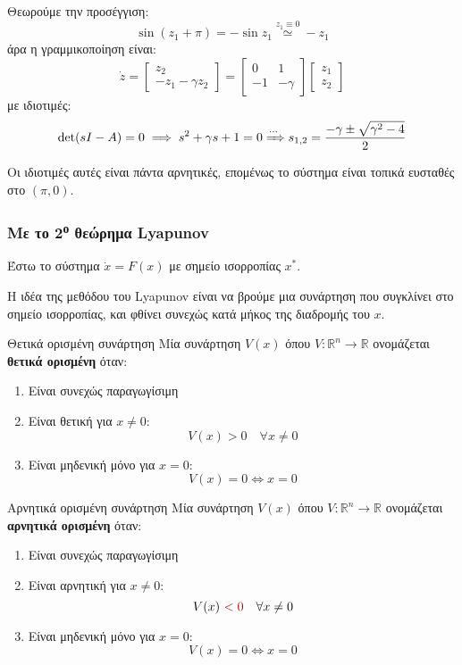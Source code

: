 \documentclass[11pt,a4paper,notitlepage,fleqn]{article}
\begin{document}
\begin{exercise}[Παράδειγμα]
    Θεωρούμε την προσέγγιση:
    \[
    \sin(z_1 + π) = -\sin z_1 \overset{z_1 \equiv 0}{\simeq} -z_1
    \]
    άρα η γραμμικοποίηση είναι:
    \[
    \dot z = \left[\begin{matrix}
    z_2 \\ -z_1-\gamma z_2
    \end{matrix}\right] = \left[\begin{matrix}
    0 & 1 \\ -1 &-\gamma
    \end{matrix}
    \right]\left[\begin{matrix}
    z_1 \\ z_2
    \end{matrix}\right]
    \]
    με ιδιοτιμές:
    \[
    \det(sI-A) = 0 \implies s^2 + \gamma s + 1 =0 \xRightarrow{\cdots} s_{1,2} = \frac{-\gamma \pm \sqrt{\gamma^2-4}}{2}
    \]
    
    Οι ιδιοτιμές αυτές είναι πάντα αρνητικές, επομένως το σύστημα είναι τοπικά ευσταθές στο \( (π,0) \).
\end{exercise}

\subsubsection{Με το 2\textsuperscript{ο} θεώρημα Lyapunov}
Έστω το σύστημα \( \dot x = F(x) \) με σημείο ισορροπίας \( x^* \).

Η ιδέα της μεθόδου του Lyapunov είναι να βρούμε μια συνάρτηση που συγκλίνει
στο σημείο ισορροπίας, και φθίνει συνεχώς κατά μήκος της διαδρομής του \( x \).

\begin{defn}{Θετικά ορισμένη συνάρτηση}{}
	Μία συνάρτηση \( V(x) \) όπου \( V: \mathbb R^n \to \mathbb R \) ονομάζεται \textbf{θετικά
		ορισμένη} όταν:
	\begin{enumerate}
		\item Είναι συνεχώς παραγωγίσιμη
		\item Είναι θετική για \( x\neq 0 \):
		\[
		V(x) > 0 \quad \forall x\neq 0
		\]
		\item Είναι μηδενική μόνο για \( x=0 \):
		\[
		V(x) = 0 \iff x=0
		\]
	\end{enumerate}
\end{defn}

\begin{defn}{Αρνητικά ορισμένη συνάρτηση}{}
	Μία συνάρτηση \( V(x) \) όπου \( V: \mathbb R^n \to \mathbb R \) ονομάζεται \textbf{αρνητικά
		ορισμένη} όταν:
	\begin{enumerate}
		\item Είναι συνεχώς παραγωγίσιμη
		\item Είναι {\color{red!70!black}αρνητική} για \( x\neq 0 \):
		\[
		V(x) ~ {\color{red!70!black}< 0} \quad \forall x\neq 0
		\]
		\item Είναι μηδενική μόνο για \( x=0 \):
		\[
		V(x) = 0 \iff x=0
		\]
	\end{enumerate}
\end{defn}
\end{document}
